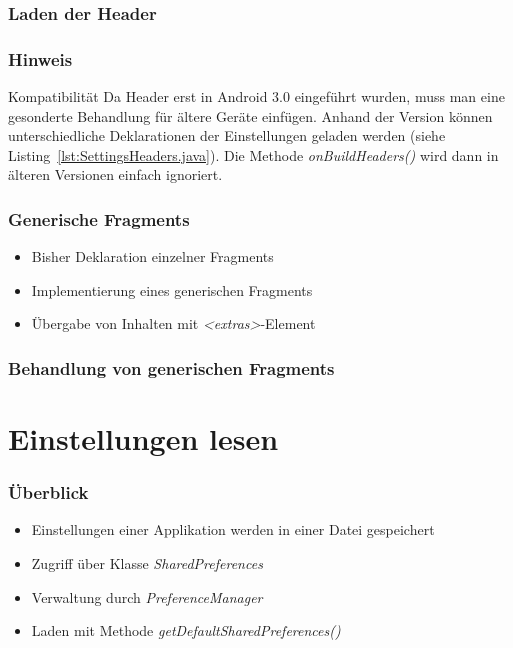 \begin{frame}
   \frametitle{Laden der Header}
   
\end{frame}

\begin{frame}
   \frametitle{Hinweis}
   \begin{alertblock}{Kompatibilität}
		Da Header erst in Android 3.0 eingeführt wurden, muss man eine gesonderte Behandlung 
		für ältere Geräte einfügen. Anhand der Version können unterschiedliche Deklarationen 
		der Einstellungen geladen werden (siehe Listing~\ref{lst:SettingsHeaders.java}). 
		Die Methode \emph{onBuildHeaders()} wird dann in älteren Versionen einfach ignoriert.
   \end{alertblock}
\end{frame}

\begin{frame}
   \frametitle{Generische Fragments}
   \begin{itemize}
      \item Bisher Deklaration einzelner Fragments
      \item Implementierung eines generischen Fragments
      \item Übergabe von Inhalten mit \emph{\textless{}extras\textgreater}-Element
   \end{itemize}

   
\end{frame}

\begin{frame}
   \frametitle{Behandlung von generischen Fragments}
   
\end{frame}

\section{Einstellungen lesen}
\begin{frame}
   \frametitle{Überblick}
   \begin{itemize}
      \item Einstellungen einer Applikation werden in einer Datei gespeichert
      \item Zugriff über Klasse \emph{SharedPreferences} 
      \item Verwaltung durch \emph{PreferenceManager}
      \item Laden mit Methode \emph{getDefaultSharedPreferences()} 
   \end{itemize}

   
\end{frame}

